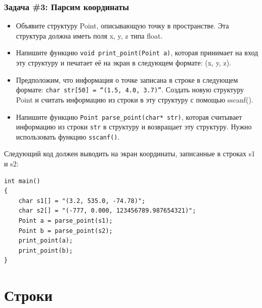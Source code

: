 \documentclass{article}
\begin{document}
\subsubsection*{\Squarepipe \quad Задача \#3: Парсим координаты}
\begin{itemize}
\item Объявите структуру Point, описывающую точку в пространстве. Эта структура должна иметь поля x, y, z типа float. 
\item Напишите функцию \texttt{void print\_point(Point a)}, которая принимает на вход эту структуру и печатает её на экран в следующем формате: (x, y, z).
\item Предположим, что информация о точке записана в строке в следующем формате: \texttt{char str[50] = ``(1.5, 4.0, 3.7)''}. Создать новую структуру Point и считать информацию из строки в эту структуру с помощью sscanf().
\item Напишите функцию \texttt{Point parse\_point(char* str)}, которая считывает информацию из строки \texttt{str} в структуру и возвращает эту структуру. Нужно использовать функцию \texttt{sscanf()}.
\end{itemize}
Следующий код должен выводить на экран координаты, записанные в строках s1 и s2:
\begin{lstlisting}
int main()
{
    char s1[] = "(3.2, 535.0, -74.78)";
    char s2[] = "(-777, 0.000, 123456789.987654321)";
    Point a = parse_point(s1);
    Point b = parse_point(s2);
    print_point(a);
    print_point(b);
}
\end{lstlisting}
\newpage
\section*{Строки}
\end{document}

